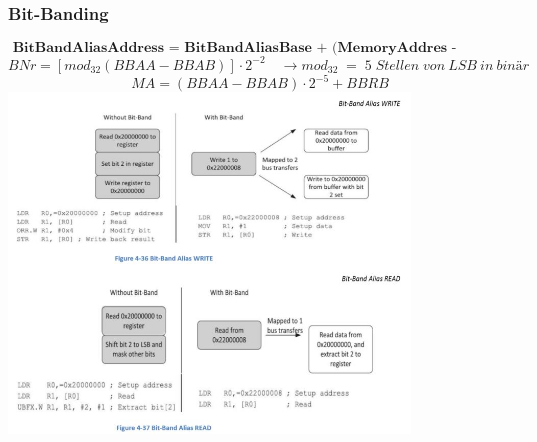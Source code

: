 \subsubsection{Bit-Banding}
\vspace{-0.5cm}
\[\textbf{ BitBandAliasAddress = BitBandAliasBase + (MemoryAddres - BitbandRegionBase)* 32 + 4*BitNumber} \]
\[ BNr=[mod_{32}(BBAA-BBAB)]\cdot 2^{-2} \quad \rightarrow mod_{32}\; =\; 5\; Stellen\; von\: LSB\: in\: binär \]
\[ MA = (BBAA-BBAB)\cdot 2^{-5} +BBRB \]
\includegraphics[width=0.8\textwidth]{images/bitbanding}